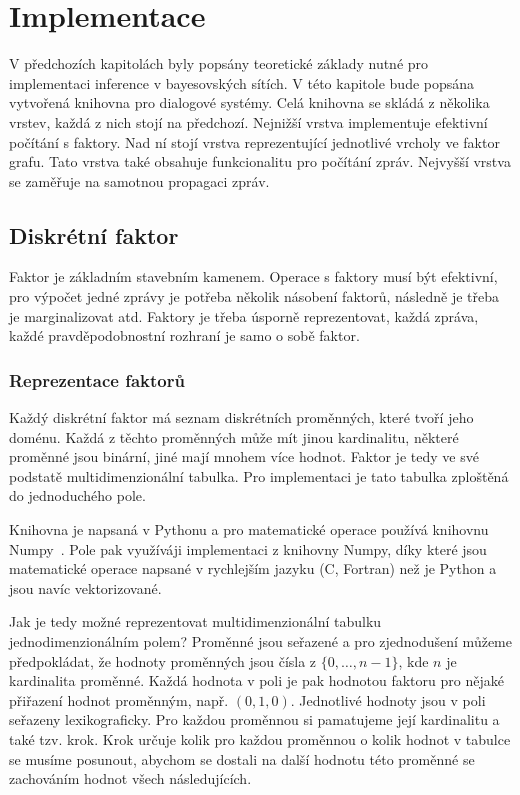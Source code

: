 \chapter{Implementace}
V předchozích kapitolách byly popsány teoretické základy nutné pro implementaci inference v bayesovských sítích.
V této kapitole bude popsána vytvořená knihovna pro dialogové systémy.
Celá knihovna se skládá z několika vrstev, každá z nich stojí na předchozí.
Nejnižší vrstva implementuje efektivní počítání s faktory.
Nad ní stojí vrstva reprezentující jednotlivé vrcholy ve faktor grafu.
Tato vrstva také obsahuje funkcionalitu pro počítání zpráv.
Nejvyšší vrstva se zaměřuje na samotnou propagaci zpráv.

\section{Diskrétní faktor}

Faktor je základním stavebním kamenem.
Operace s faktory musí být efektivní, pro výpočet jedné zprávy je potřeba několik násobení faktorů, následně je třeba je marginalizovat atd.
Faktory je třeba úsporně reprezentovat, každá zpráva, každé pravděpodobnostní rozhraní je samo o sobě faktor.

\subsection{Reprezentace faktorů}

Každý diskrétní faktor má seznam diskrétních proměnných, které tvoří jeho doménu.
Každá z těchto proměnných může mít jinou kardinalitu, některé proměnné jsou binární, jiné mají mnohem více hodnot.
Faktor je tedy ve své podstatě multidimenzionální tabulka.
Pro implementaci je tato tabulka zploštěná do jednoduchého pole.

Knihovna je napsaná v Pythonu a pro matematické operace používá knihovnu Numpy~\cite{oliphant-2006-guide}.
Pole pak využíváji implementaci z knihovny Numpy, díky které jsou matematické operace napsané v rychlejším jazyku (C, Fortran) než je Python a jsou navíc vektorizované.

Jak je tedy možné reprezentovat multidimenzionální tabulku jednodimenzionálním polem?
Proměnné jsou seřazené a pro zjednodušení můžeme předpokládat, že hodnoty proměnných jsou čísla z $\{0, \dots, n-1\}$, kde $n$ je kardinalita proměnné.
Každá hodnota v poli je pak hodnotou faktoru pro nějaké přiřazení hodnot proměnným, např. $(0, 1, 0)$.
Jednotlivé hodnoty jsou v poli seřazeny lexikograficky.
Pro každou proměnnou si pamatujeme její kardinalitu a také tzv. krok.
Krok určuje kolik pro každou proměnnou o kolik hodnot v tabulce se musíme posunout, abychom se dostali na další hodnotu této proměnné se zachováním hodnot všech následujících.

